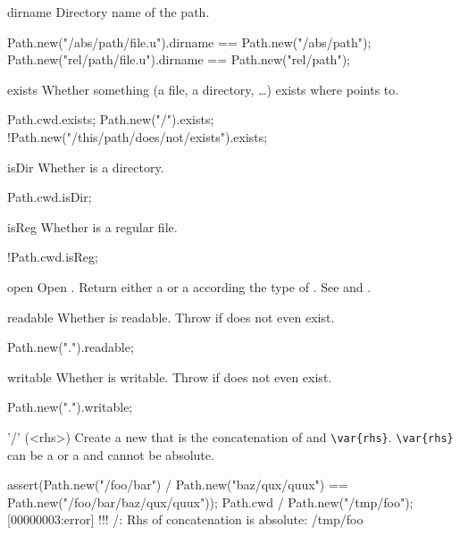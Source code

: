 \begin{urbiscriptapi}
\item[dirname]
  Directory name of the path.
\begin{urbiassert}
Path.new("/abs/path/file.u").dirname == Path.new("/abs/path");
Path.new("rel/path/file.u").dirname  == Path.new("rel/path");
\end{urbiassert}

\item[exists]
  Whether something (a file, a directory, \ldots) exists where
  \this points to.
\begin{urbiassert}
Path.cwd.exists;
Path.new("/").exists;
!Path.new("/this/path/does/not/exists").exists;
\end{urbiassert}

\item[isDir]
  Whether \this is a directory.
\begin{urbiassert}
Path.cwd.isDir;
\end{urbiassert}

\item[isReg]
  Whether \this is a regular file.
\begin{urbiassert}
!Path.cwd.isReg;
\end{urbiassert}

\item[open]
  Open \this. Return either a  or a
   according the type of \this. See
   and .

\item[readable]
  Whether \this is readable.  Throw if does not even exist.
\begin{urbiassert}
Path.new(".").readable;
\end{urbiassert}

\item[writable]
  Whether \this is writable.  Throw if does not even exist.
\begin{urbiassert}
Path.new(".").writable;
\end{urbiassert}

\item['/'](<rhs>)%
  Create a new  that is the concatenation of
  \this and \lstinline|\var{rhs}|. \lstinline|\var{rhs}|
  can be a  or a  and cannot be absolute.
\begin{urbiscript}
assert(Path.new("/foo/bar") / Path.new("baz/qux/quux")
       == Path.new("/foo/bar/baz/qux/quux"));
Path.cwd / Path.new("/tmp/foo");
[00000003:error] !!! /: Rhs of concatenation is absolute: /tmp/foo
\end{urbiscript}


\end{urbiscriptapi}
